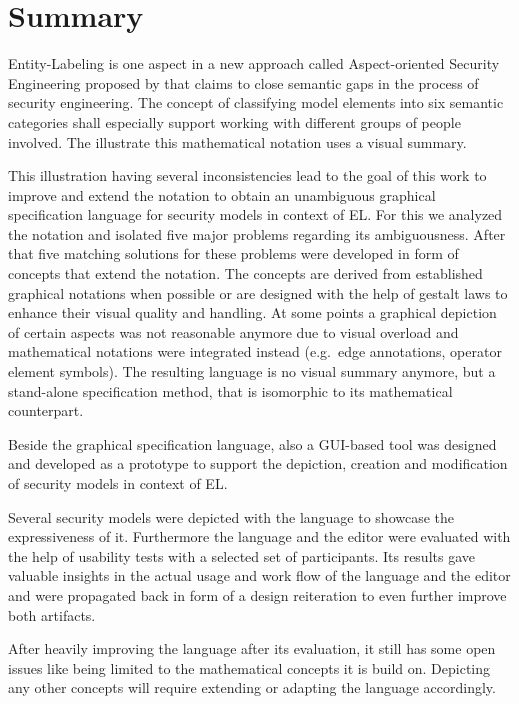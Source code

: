 \documentclass[twoside, openright, 12pt]{book}
\begin{document}




\cleardoublepage
\chapter{Summary}
\label{summary}
Entity-Labeling is one aspect in a new approach called Aspect-oriented Security Engineering proposed by \cite{Amthor18} that claims to close semantic gaps in the process of security engineering.
The concept of classifying model elements into six semantic categories shall especially support working with different groups of people involved.
The illustrate this mathematical notation \cite{Amthor18} uses a visual summary.

This illustration having several inconsistencies lead to the goal of this work to improve and extend the notation to obtain an unambiguous graphical specification language for security models in context of EL.
For this we analyzed the notation and isolated five major problems regarding its ambiguousness.
After that five matching solutions for these problems were developed in form of concepts that extend the notation.
The concepts are derived from established graphical notations when possible or are designed with the help of gestalt laws to enhance their visual quality and handling.
At some points a graphical depiction of certain aspects was not reasonable anymore due to visual overload and mathematical notations were integrated instead (e.g.\ edge annotations, operator element symbols).
The resulting language is no visual summary anymore, but a stand-alone specification method, that is isomorphic to its mathematical counterpart.

Beside the graphical specification language, also a GUI-based tool was designed and developed as a prototype to support the depiction, creation and modification of security models in context of EL.

Several security models were depicted with the language to showcase the expressiveness of it.
Furthermore the language and the editor were evaluated with the help of usability tests with a selected set of participants.
Its results gave valuable insights in the actual usage and work flow of the language and the editor and were propagated back in form of a design reiteration to even further improve both artifacts.

After heavily improving the language after its evaluation, it still has some open issues like being limited to the mathematical concepts it is build on.
Depicting any other concepts will require extending or adapting the language accordingly.
\end{document}
